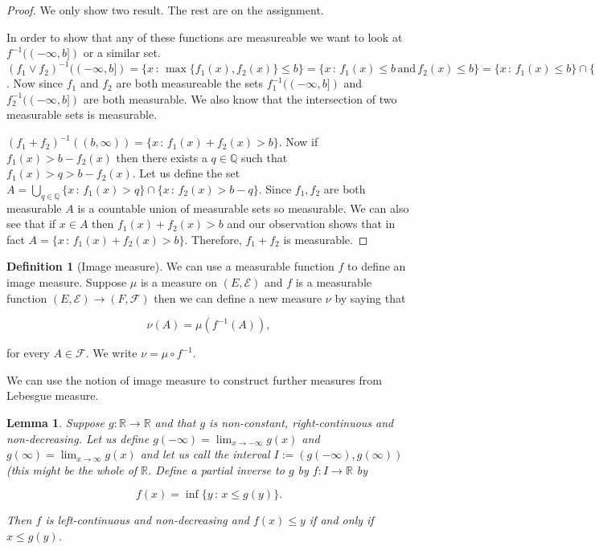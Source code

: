 \documentclass[
]{book}
\newtheorem{lemma}{Lemma}[chapter]
\theoremstyle{definition}
\newtheorem{definition}{Definition}[chapter]
\theoremstyle{definition}
\theoremstyle{definition}
\theoremstyle{definition}
\theoremstyle{remark}
\begin{document}
\begin{proof}
We only show two result. The rest are on the assignment.

In order to show that any of these functions are measureable we want to look at \(f^{-1}((-\infty, b])\) or a similar set. \((f_1 \vee f_2)^{-1}((-\infty, b]) = \{ x \,:\, \max\{f_1(x), f_2(x)\} \leq b\} = \{ x \,:\, f_1(x) \leq b \, \mbox{and} \, f_2(x) \leq b\} = \{ x \,:\, f_1(x) \leq b \} \cap \{x \,:\, f_2(x) \leq b\} = f_1^{-1}((-\infty, b]) \cap f_2^{-1}((-\infty, b])\). Now since \(f_1\) and \(f_2\) are both measureable the sets \(f_1^{-1}((-\infty, b])\) and \(f_2^{-1}((-\infty, b])\) are both measurable. We also know that the intersection of two measurable sets is measurable.

\((f_1+f_2)^{-1}((b,\infty)) = \{ x \,:\, f_1(x) + f_2(x) > b \}\). Now if \(f_1(x) > b-f_2(x)\) then there exists a \(q \in \mathbb{Q}\) such that \(f_1(x)> q > b - f_2(x)\). Let us define the set \(A= \bigcup_{q \in \mathbb{Q}} \{ x \,:\, f_1(x) > q\} \cap \{ x\,:\, f_2(x) > b-q\}\). Since \(f_1,f_2\) are both measurable \(A\) is a countable union of measurable sets so measurable. We can also see that if \(x \in A\) then \(f_1(x) + f_2(x) > b\) and our observation shows that in fact \(A= \{ x \,:\, f_1(x) + f_2(x) > b \}\). Therefore, \(f_1+f_2\) is measurable.
\end{proof}

\begin{definition}[Image measure]
We can use a measurable function \(f\) to define an image measure. Suppose \(\mu\) is a measure on \((E, \mathcal{E})\) and \(f\) is a measurable function \((E, \mathcal{E}) \rightarrow (F, \mathcal{F})\) then we can define a new measure \(\nu\) by saying that

\[ \nu(A) = \mu(f^{-1}(A)),  \]

for every \(A \in \mathcal{F}\). We write \(\nu = \mu \circ f^{-1}\).
\end{definition}

We can use the notion of image measure to construct further measures from Lebesgue measure.

\begin{lemma}
Suppose \(g: \mathbb{R} \rightarrow \mathbb{R}\) and that \(g\) is non-constant, right-continuous and non-decreasing. Let us define \(g(-\infty) = \lim_{x \rightarrow -\infty} g(x)\) and \(g(\infty) = \lim_{x \rightarrow \infty} g(x)\) and let us call the interval \(I:= (g(-\infty),g(\infty))\) (this might be the whole of \(\mathbb{R}\). Define a partial inverse to \(g\) by \(f: I \rightarrow \mathbb{R}\) by

\[ f(x) = \inf \{y \,:\, x \leq g(y)\}. \]

Then \(f\) is left-continuous and non-decreasing and \(f(x) \leq y\) if and only if \(x \leq g(y)\).
\end{lemma}
\end{document}
